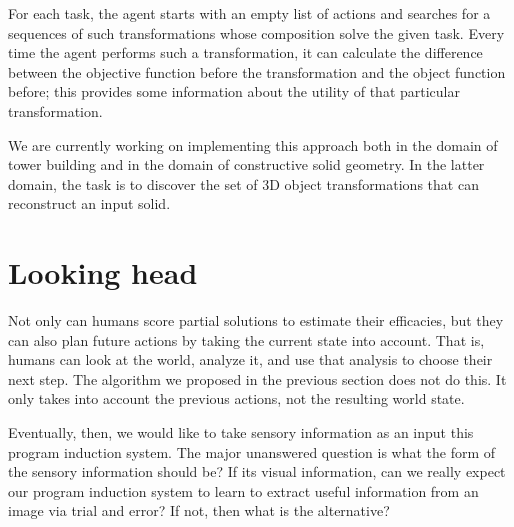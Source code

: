 \documentclass{article}
\begin{document}
For each task, the agent starts with an empty list of actions and
searches for a sequences of such transformations whose composition
solve the given task. Every time the agent performs such a
transformation, it can calculate the difference between the objective
function before the transformation and the object function before;
this provides some information about the utility of that particular
transformation.

We are currently working on implementing this approach both in the
domain of tower building and in the domain of constructive solid
geometry. In the latter domain, the task is to discover the set of 3D
object transformations that can reconstruct an input solid. 

\section{Looking head}
Not only can humans score partial solutions to estimate their
efficacies, but they can also plan future actions by taking the
current state into account. That is, humans can look at the world,
analyze it, and use that analysis to choose their next step. The
algorithm we proposed in the previous section does not do this. It
only takes into account the previous actions, not the resulting world
state. 

Eventually, then, we would like to take sensory information as an
input this program induction system. The major unanswered question is
what the form of the sensory information should be? If its visual
information, can we really expect our program induction system to
learn to extract useful information from an image via trial and error?
If not, then what is the alternative?
\end{document}
